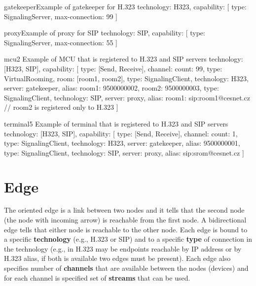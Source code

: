 \begin{itemize}
\begin{TopologyExample}{gatekeeper}{Example of gatekeeper for H.323}
technology: H323,
capability: [
  {type: SignalingServer, max-connection: 99}
]
\end{TopologyExample}

\begin{TopologyExample}{proxy}{Example of proxy for SIP}
technology: SIP,
capability: [
  {type: SignalingServer, max-connection: 55}
]
\end{TopologyExample}

\begin{TopologyExample}{mcu2}
      {Example of MCU that is registered to H.323 and SIP servers}
technology: [H323, SIP],
capability: [
  {type: [Send, Receive], channel: {count: 99}},
  {type: VirtualRooming, room: [room1, room2]},
  {type: SignalingClient, technology: H323, server: gatekeeper,
     alias: {room1: 9500000002, room2: 9500000003}},
  {type: SignalingClient, technology: SIP, server: proxy,
     alias: {room1: sip:room1@cesnet.cz}} // room2 is registered only to H.323
]
\end{TopologyExample}

\begin{TopologyExample}{terminal5}
      {Example of terminal that is registered to H.323 and SIP servers}
technology: [H323, SIP],
capability: [
  {type: [Send, Receive], channel: {count: 1}},
  {type: SignalingClient, technology: H323, server: gatekeeper,
     alias: 9500000001},
  {type: SignalingClient, technology: SIP, server: proxy,
     alias: sip:srom@cesnet.cz}
]
\end{TopologyExample}

\end{itemize}
 

\section{Edge}

The oriented edge is a link between two nodes and it tells that the second 
node (the node with incoming arrow) is reachable from the first node. A 
bidirectional edge tells that either node is reachable to the other node. 
Each edge is bound to a specific \textbf{technology} (e.g., H.323 or SIP) and 
to a specific \textbf{type} of connection in the technology (e.g., in H.323 
may be endpoints reachable by IP address or by H.323 alias, if both is 
available two edges must be present). Each edge also specifies number of 
\textbf{channels} that are available between the nodes (devices) and for each 
channel is specified set of \textbf{streams} that can be used.

